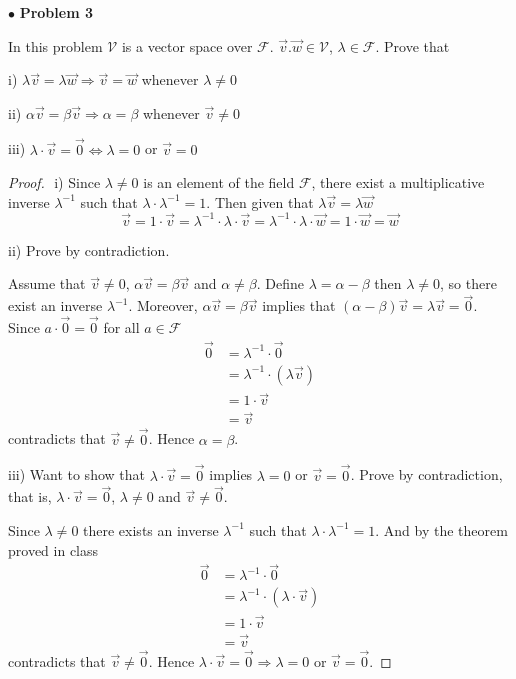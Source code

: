 \documentclass{article}
\begin{document}
\newpage
$\bullet$ \textbf{Problem 3}
\medskip

\begin{itshape}
In this problem $\mathcal{V}$ is a vector space over $\mathcal{F}$. $\vec{v}. \vec{w} \in \mathcal{V}$, $\lambda \in \mathcal{F}$. Prove that

i) $\lambda \vec{v} = \lambda \vec{w} \Rightarrow \vec{v} = \vec{w}$ whenever $\lambda \neq 0$

ii) $\alpha \vec{v} = \beta \vec{v} \Rightarrow \alpha = \beta$ whenever $\vec{v} \neq 0$

iii) $\lambda \cdot \vec{v} = \vec{0} \Leftrightarrow \lambda=0$ or $\vec{v} =0 $
\end{itshape}
\medskip

\begin{proof}
$ $ \newline
i) Since $\lambda \ne 0$ is an element of the field $\mathcal{F}$, there exist a multiplicative inverse $\lambda^{-1}$ such that $\lambda \cdot \lambda^{-1} =1$. Then given that $\lambda \vec{v} = \lambda \vec{w}$
$$ \vec{v} = 1 \cdot \vec{v} = \lambda^{-1} \cdot \lambda \cdot \vec{v} = \lambda^{-1} \cdot \lambda \cdot \vec{w} = 1 \cdot \vec{w} = \vec{w}$$
\smallskip

ii) Prove by contradiction. 

Assume that $\vec{v} \ne 0$, $\alpha \vec{v} = \beta \vec{v}$ and $\alpha \ne \beta$. Define $\lambda = \alpha - \beta$ then $\lambda \ne 0$, so there exist an inverse $\lambda^{-1}$. Moreover, $\alpha \vec{v} = \beta \vec{v}$ implies that $(\alpha - \beta) \vec{v} = \lambda \vec{v} =\vec{0}$. Since $a \cdot \vec{0} = \vec{0}$ for all $a \in \mathcal{F}$
\begin{align*}
\vec{0} &= \lambda^{-1} \cdot \vec{0} \\
&= \lambda^{-1} \cdot (\lambda \vec{v})\\
&= 1 \cdot \vec{v}\\
&= \vec{v}
\end{align*}
contradicts that $\vec{v} \ne \vec{0}$. Hence $\alpha = \beta$.
\smallskip

iii) Want to show that $\lambda \cdot \vec{v} = \vec{0}$ implies $\lambda = 0$ or $\vec{v} = \vec{0}$. Prove by 
contradiction, that is, $\lambda \cdot \vec{v} = \vec{0}$, $\lambda \ne 0$ and $\vec{v} \ne \vec{0}$.

Since $\lambda \ne 0$ there exists an inverse $\lambda^{-1}$ such that $\lambda \cdot \lambda^{-1} = 1$. And by the theorem proved in class
\begin{align*}
\vec{0} &= \lambda^{-1} \cdot \vec{0}\\
&= \lambda^{-1} \cdot (\lambda \cdot \vec{v})\\
&= 1 \cdot \vec{v}\\
&= \vec{v}
\end{align*}
contradicts that $\vec{v} \ne \vec{0}$. Hence  $\lambda \cdot \vec{v} = \vec{0} \Rightarrow \lambda = 0$ or $\vec{v} = \vec{0}$.


\end{proof}
\end{document}
